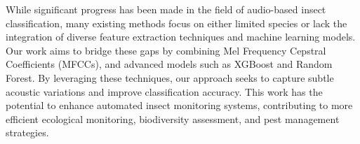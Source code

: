 While significant progress has been made in the field of audio-based insect classification, many existing methods focus on either limited species or lack the integration of diverse feature extraction techniques and machine learning models. Our work aims to bridge these gaps by combining Mel Frequency Cepstral Coefficients (MFCCs), and advanced models such as XGBoost and Random Forest. By leveraging these techniques, our approach seeks to capture subtle acoustic variations and improve classification accuracy. This work has the potential to enhance automated insect monitoring systems, contributing to more efficient ecological monitoring, biodiversity assessment, and pest management strategies.